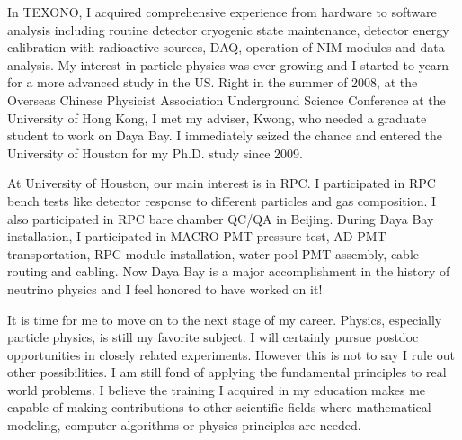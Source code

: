 \documentclass[10pt]{article}
\begin{document}

In TEXONO, I acquired comprehensive experience from hardware to software analysis including routine detector cryogenic state maintenance, detector energy calibration with radioactive sources, DAQ, operation of NIM modules and data analysis. My interest in particle physics was ever growing and I started to yearn for a more advanced study in the US. Right in the summer of 2008, at the Overseas Chinese Physicist Association Underground Science Conference at the University of Hong Kong, I met my adviser, Kwong, who needed a graduate student to work on Daya Bay. I immediately seized the chance and entered the University of Houston for my Ph.D. study since 2009.


At University of Houston, our main interest is in RPC. I participated in RPC bench tests like detector response to different particles and gas composition. I also participated in RPC bare chamber QC/QA in Beijing. During Daya Bay installation, I participated in MACRO PMT pressure test, AD PMT transportation, RPC module installation, water pool PMT assembly, cable routing and cabling. Now Daya Bay is a major accomplishment in the history of neutrino physics and I feel honored to have worked on it!

It is time for me to move on to the next stage of my career. Physics, especially particle physics, is still my favorite subject. I will certainly pursue postdoc opportunities in closely related experiments. However this is not to say I rule out other possibilities. I am still fond of applying the fundamental principles to real world problems. I believe the training I acquired in my education makes me capable of making contributions to other scientific fields where mathematical modeling, computer algorithms or physics principles are needed.
\end{document}
